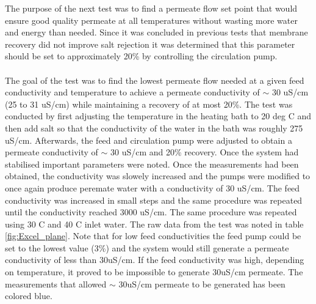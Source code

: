 The purpose of the next test was to find a permeate flow set point that would ensure good quality permeate at all temperatures without wasting more water and energy than needed. Since it was concluded in previous tests that membrane recovery did not improve salt rejection it was determined that this parameter should be set to approximately 20\% by controlling the circulation pump. \\
\\
The goal of the test was to find the lowest permeate flow needed at a given feed conductivity and temperature to achieve a permeate conductivity of  $\sim$ 30 uS/cm (25 to 31 uS/cm) while maintaining a recovery of at most 20\%. The test was conducted by first adjusting the temperature in the heating bath to 20 deg C and then add salt so that the conductivity of the water in the bath was roughly 275 uS/cm. Afterwards, the feed and circulation pump were adjusted to obtain a  permeate conductivity of  $\sim$ 30 uS/cm and 20\% recovery. Once the system had stabilised important parameters were noted. Once the measurements had been obtained, the conductivity was slowely increased and the pumps were modified to once again produce peremate water with a conductivity of 30 uS/cm. The feed conductivity was increased in small steps and the same procedure was repeated until the conductivity reached 3000 uS/cm. The same procedure was repeated using 30 C and 40 C inlet water. The raw data from the test was noted in table \ref{fig:Excel_plane}. Note that for low feed conductivities the feed pump could be set to the lowest value (3\%) and the system would still generate a permeate conductivity of less than 30uS/cm. If the feed conductivity was high, depending on temperature, it proved to be impossible to generate 30uS/cm permeate. The measurements that allowed  $\sim$ 30uS/cm permeate to be generated has been colored blue.

